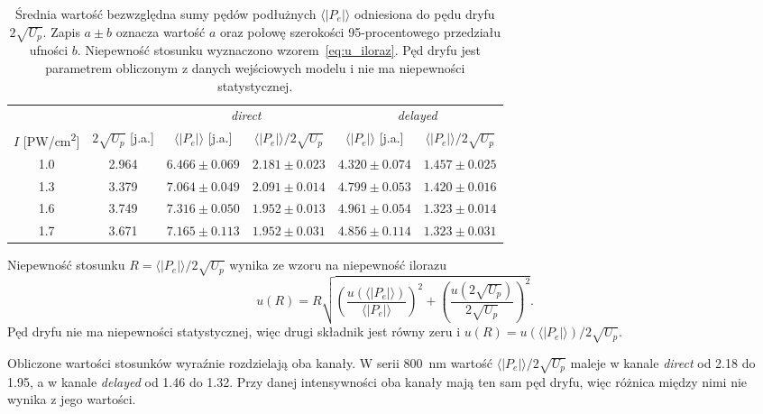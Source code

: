 \documentclass[12pt,a4paper]{article}
\newcommand{\ja}{j.a.}
\newcommand{\PWcm}{PW/cm\textsuperscript{2}}
\begin{document}
\begin{table}[!h]
\centering
\small
\caption{Średnia wartość bezwzględna sumy pędów podłużnych
$\langle|P_e|\rangle$ odniesiona do pędu dryfu $2\sqrt{U_p}$. Zapis
$a\pm b$ oznacza wartość $a$ oraz połowę szerokości 95-procentowego
przedziału ufności $b$. Niepewność stosunku wyznaczono
wzorem~\eqref{eq:u_iloraz}. Pęd dryfu jest parametrem obliczonym
z danych wejściowych modelu i nie ma niepewności statystycznej.}
\label{tab:dryf}
\begin{tabular}{c c c c c c}
\toprule
 &  & \multicolumn{2}{c}{\emph{direct}}
   & \multicolumn{2}{c}{\emph{delayed}} \\
\cmidrule(lr){3-4}
\cmidrule(lr){5-6}
$I$ [\PWcm] & $2\sqrt{U_p}$ [\ja] & $\langle|P_e|\rangle$ [\ja]
  & $\langle|P_e|\rangle/2\sqrt{U_p}$ & $\langle|P_e|\rangle$ [\ja]
  & $\langle|P_e|\rangle/2\sqrt{U_p}$ \\
\midrule
\num{1.0} & \num{2.964} & $\num{6.466}\pm\num{0.069}$ & $\num{2.181}\pm\num{0.023}$ & $\num{4.320}\pm\num{0.074}$ & $\num{1.457}\pm\num{0.025}$ \\
\num{1.3} & \num{3.379} & $\num{7.064}\pm\num{0.049}$ & $\num{2.091}\pm\num{0.014}$ & $\num{4.799}\pm\num{0.053}$ & $\num{1.420}\pm\num{0.016}$ \\
\num{1.6} & \num{3.749} & $\num{7.316}\pm\num{0.050}$ & $\num{1.952}\pm\num{0.013}$ & $\num{4.961}\pm\num{0.054}$ & $\num{1.323}\pm\num{0.014}$ \\
\num{1.7} & \num{3.671} & $\num{7.165}\pm\num{0.113}$ & $\num{1.952}\pm\num{0.031}$ & $\num{4.856}\pm\num{0.114}$ & $\num{1.323}\pm\num{0.031}$ \\
\bottomrule
\end{tabular}
\end{table}

Niepewność stosunku $R=\langle|P_e|\rangle/2\sqrt{U_p}$ wynika ze wzoru na
niepewność ilorazu
\begin{equation}
u(R)=R\sqrt{\left(\frac{u(\langle|P_e|\rangle)}{\langle|P_e|\rangle}\right)^2
+\left(\frac{u(2\sqrt{U_p})}{2\sqrt{U_p}}\right)^2}.
\label{eq:u_iloraz}
\end{equation}
Pęd dryfu nie ma niepewności statystycznej, więc drugi składnik jest
równy zeru i $u(R)=u(\langle|P_e|\rangle)/2\sqrt{U_p}$.

Obliczone wartości stosunków wyraźnie rozdzielają oba kanały. W serii \num{800}~nm wartość $\langle|P_e|\rangle/2\sqrt{U_p}$ maleje w kanale \emph{direct} od \num{2.18} do \num{1.95}, a w kanale
\emph{delayed} od \num{1.46} do \num{1.32}. Przy danej intensywności oba
kanały mają ten sam pęd dryfu, więc różnica między nimi nie wynika z
jego wartości.
\end{document}
